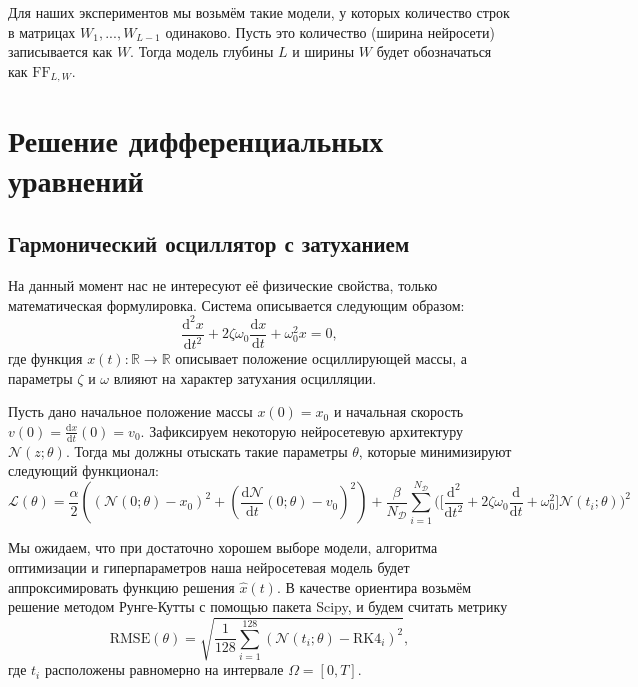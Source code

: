 \documentclass[a4paper, 12pt]{article}
\begin{document}
Для наших экспериментов мы возьмём такие модели, у которых количество строк в матрицах $W_1, ..., W_{L-1}$ одинаково. Пусть это количество (ширина нейросети) записывается как $W$. Тогда модель глубины $L$ и ширины $W$ будет обозначаться как $\mathrm{FF}_{L, W}$.

\section{Решение дифференциальных уравнений} \label{section:diffeqsolving}

\subsection{Гармонический осциллятор с затуханием}

На данный момент нас не интересуют её физические свойства, только математическая формулировка. Система описывается следующим образом:
\begin{equation} \label{eq:oscillator:diffeq}
    \frac{\mathrm{d}^2 x}{\mathrm{d} t^2} + 2\zeta \omega_0\frac {\mathrm {d} x}{\mathrm {d} t} + \omega _0^2x = 0,
\end{equation}
где функция $x(t) : \mathbb{R} \to \mathbb{R}$ описывает положение осциллирующей массы, а параметры $\zeta$ и $\omega$ влияют на характер затухания осцилляции.

Пусть дано начальное положение массы $x(0) = x_0$ и начальная скорость $v(0) = \frac{\mathrm{d} x}{\mathrm{d} t}(0) = v_0$. Зафиксируем некоторую нейросетевую архитектуру $\mathcal{N}(z; \theta)$. Тогда мы должны отыскать такие параметры $\theta$, которые минимизируют следующий функционал:
\begin{equation*}
    \mathcal{L}(\theta) = \frac{\alpha}{2}((\mathcal{N}(0; \theta) - x_0)^2 + (\frac{\mathrm{d}\mathcal{N}}{\mathrm{d}t}(0; \theta) - v_0)^2) + \frac{\beta}{N_{\mathcal{D}}} \sum_{i = 1}^{N_{\mathcal{D}}} \Big(\Big[\frac{\mathrm{d}^2}{\mathrm{d} t^2} + 2\zeta \omega_0\frac {\mathrm {d}}{\mathrm {d} t} + \omega _0^2\Big]\mathcal{N}(t_i; \theta)\Big)^2
\end{equation*}

Мы ожидаем, что при достаточно хорошем выборе модели, алгоритма оптимизации и гиперпараметров наша нейросетевая модель будет аппроксимировать функцию решения $\hat{x}(t)$. В качестве ориентира возьмём решение методом Рунге-Кутты с помощью пакета Scipy, и будем считать метрику
$$
\mathrm{RMSE}(\theta) = \sqrt{\frac{1}{128}\sum_{i=1}^{128}(\mathcal{N}(t_i;\theta) - \mathrm{RK4}_i)^2},
$$
где $t_i$ расположены равномерно на интервале $\Omega = [0, T]$.
\end{document}
